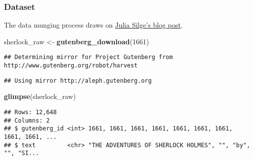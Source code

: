 \documentclass[
]{book}
\newenvironment{Shaded}{\begin{snugshade}}{\end{snugshade}}
\newcommand{\DecValTok}[1]{\textcolor[rgb]{0.00,0.00,0.81}{#1}}
\newcommand{\KeywordTok}[1]{\textcolor[rgb]{0.13,0.29,0.53}{\textbf{#1}}}
\newcommand{\NormalTok}[1]{#1}
\newcommand{\StringTok}[1]{\textcolor[rgb]{0.31,0.60,0.02}{#1}}
\begin{document}
\hypertarget{dataset-1}{%
\subsubsection{Dataset}\label{dataset-1}}

The data munging process draws on \href{https://juliasilge.com/blog/sherlock-holmes-stm/}{Julia Silge's blog post}.

\begin{Shaded}
\begin{Highlighting}[]
\NormalTok{sherlock\_raw \textless{}{-}}\StringTok{ }\KeywordTok{gutenberg\_download}\NormalTok{(}\DecValTok{1661}\NormalTok{)}
\end{Highlighting}
\end{Shaded}

\begin{verbatim}
## Determining mirror for Project Gutenberg from http://www.gutenberg.org/robot/harvest
\end{verbatim}

\begin{verbatim}
## Using mirror http://aleph.gutenberg.org
\end{verbatim}

\begin{Shaded}
\begin{Highlighting}[]
\KeywordTok{glimpse}\NormalTok{(sherlock\_raw)}
\end{Highlighting}
\end{Shaded}

\begin{verbatim}
## Rows: 12,648
## Columns: 2
## $ gutenberg_id <int> 1661, 1661, 1661, 1661, 1661, 1661, 1661, 1661, 1661, ...
## $ text         <chr> "THE ADVENTURES OF SHERLOCK HOLMES", "", "by", "", "SI...
\end{verbatim}
\end{document}
